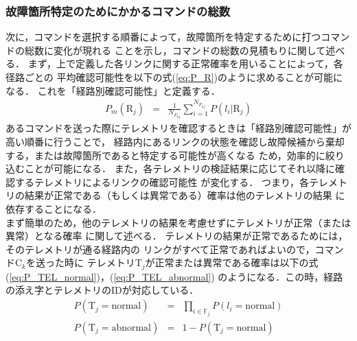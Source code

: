 \documentclass[11pt]{jsreport}
\begin{document}
\subsubsection{故障箇所特定のためにかかるコマンドの総数}
次に，コマンドを選択する順番によって，故障箇所を特定するために打つコマンドの総数に変化が現れる
ことを示し，コマンドの総数の見積もりに関して述べる．
まず，上で定義した各リンクに関する正常確率を用いることによって，各径路ごとの
平均確認可能性を以下の式(\ref{eq:P_R})のように求めることが可能になる．%
これを「経路別確認可能性」と定義する．
\begin{eqnarray}
   P_m(\text{R}_j)  &=& \frac{1}{N_{F_{kj}}}\sum_{i=1}^{N_{F_{kj}}}P(l_i|\text{R}_j) \label{eq:P_R}
\end{eqnarray}
あるコマンドを送った際にテレメトリを確認するときは「経路別確認可能性」が高い順番に行うことで，
経路内にあるリンクの状態を確認し故障候補から棄却する，または故障箇所であると特定する可能性が高くなる
ため，効率的に絞り込むことが可能になる．
また，各テレメトリの検証結果に応じてそれ以降に確認するテレメトリによるリンクの確認可能性
が変化する．%
つまり，各テレメトリの結果が正常である（もしくは異常である）確率は他のテレメトリの結果
に依存することになる．\\
まず簡単のため，他のテレメトリの結果を考慮せずにテレメトリが正常（または異常）となる確率
に関して述べる．
テレメトリの結果が正常であるためには，そのテレメトリが通る経路内の
リンクがすべて正常であればよいので，コマンドC$_k$を送った時に
テレメトリT$_j$が正常または異常である確率は以下の式(\ref{eq:P_TEL_normal})，(\ref{eq:P_TEL_abnormal})
のようになる．この時，経路の添え字とテレメトリのIDが対応している．
\begin{eqnarray}
   P(\text{T}_j = \text{normal}) &=& \prod_{i\in\mathbb{F}_j} P(l_i = \text{normal}) \label{eq:P_TEL_normal}\\
   P(\text{T}_j = \text{abnormal}) &=& 1 - P(\text{T}_j = \text{normal}) \label{eq:P_TEL_abnormal}
\end{eqnarray}
\end{document}

